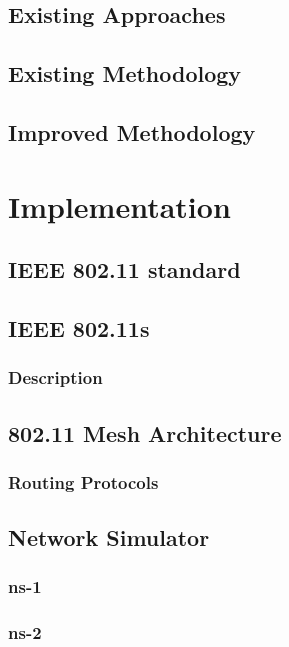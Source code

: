 \documentclass[12pt,a4paper]{report}
\begin{document}
\section{Existing Approaches}
\section{Existing Methodology }
\section{Improved Methodology}

\chapter{Implementation}
\section{IEEE 802.11 standard}

\section{IEEE 802.11s}
\subsection*{Description}
\section{802.11 Mesh Architecture}
\subsection*{Routing Protocols}
\section{Network Simulator}
\subsection{ns-1}
\subsection{ns-2}
\end{document}
